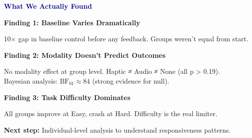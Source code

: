 \documentclass{beamer}
\begin{document}
\begin{frame}[plain]
  \vspace{0.6cm}
  \centering

  \textcolor{darkblue}{\Large \textbf{What We Actually Found}}

  \vspace{0.6cm}

  \textbf{\small Finding 1: Baseline Varies Dramatically}

  {\tiny 10× gap in baseline control before any feedback. Groups weren't equal from start.}

  \vspace{0.4cm}

  \textbf{\small Finding 2: Modality Doesn't Predict Outcomes}

  {\tiny No modality effect at group level. Haptic ≠ Audio ≠ None (all p > 0.19). \\
  Bayesian analysis: $\text{BF}_{01} \approx 84$ (strong evidence for null).}

  \vspace{0.4cm}

  \textbf{\small Finding 3: Task Difficulty Dominates}

  {\tiny All groups improve at Easy, crash at Hard. Difficulty is the real limiter.}

  \vspace{0.5cm}


  \vspace{0.3cm}

  {\tiny \textbf{Next step:} Individual-level analysis to understand responsiveness patterns.}
\end{frame}
\end{document}
